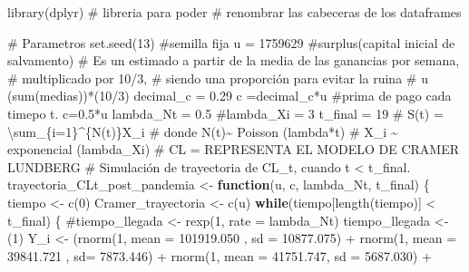 \documentclass[
  us-letterpaper,
]{scrreprt}
\newenvironment{Shaded}{\begin{snugshade}}{\end{snugshade}}
\newcommand{\AttributeTok}[1]{\textcolor[rgb]{0.40,0.45,0.13}{#1}}
\newcommand{\CommentTok}[1]{\textcolor[rgb]{0.37,0.37,0.37}{#1}}
\newcommand{\ControlFlowTok}[1]{\textcolor[rgb]{0.00,0.23,0.31}{\textbf{#1}}}
\newcommand{\DecValTok}[1]{\textcolor[rgb]{0.68,0.00,0.00}{#1}}
\newcommand{\FloatTok}[1]{\textcolor[rgb]{0.68,0.00,0.00}{#1}}
\newcommand{\FunctionTok}[1]{\textcolor[rgb]{0.28,0.35,0.67}{#1}}
\newcommand{\NormalTok}[1]{\textcolor[rgb]{0.00,0.23,0.31}{#1}}
\newcommand{\OtherTok}[1]{\textcolor[rgb]{0.00,0.23,0.31}{#1}}
\newcommand{\SpecialCharTok}[1]{\textcolor[rgb]{0.37,0.37,0.37}{#1}}
\theoremstyle{plain}
\theoremstyle{plain}
\theoremstyle{definition}
\theoremstyle{remark}
\begin{document}
\begin{Shaded}
\begin{Highlighting}[]
\FunctionTok{library}\NormalTok{(dplyr) }\CommentTok{\# libreria para poder }
\CommentTok{\# renombrar las cabeceras de los dataframes}

\CommentTok{\# Parametros}
\FunctionTok{set.seed}\NormalTok{(}\DecValTok{13}\NormalTok{) }\CommentTok{\#semilla fija}
\NormalTok{u }\OtherTok{=} \DecValTok{1759629} \CommentTok{\#surplus(capital inicial de salvamento)}
\CommentTok{\# Es un estimado a partir de la media de las ganancias por semana, }
\CommentTok{\# multiplicado por 10/3, }
\CommentTok{\# siendo una proporción para evitar la ruina}
\CommentTok{\# u (sum(medias))*(10/3)}
\NormalTok{decimal\_c }\OtherTok{=} \FloatTok{0.29}
\NormalTok{c }\OtherTok{=}\NormalTok{decimal\_c}\SpecialCharTok{*}\NormalTok{u }\CommentTok{\#prima de pago cada timepo t. c=0.5*u}
\NormalTok{lambda\_Nt }\OtherTok{=} \FloatTok{0.5}
\CommentTok{\#lambda\_Xi = 3}
\NormalTok{t\_final }\OtherTok{=} \DecValTok{19}
\CommentTok{\# S(t) = \textbackslash{}sum\_\{i=1\}\^{}\{N(t)\}X\_i}
\CommentTok{\# donde N(t)\textasciitilde{} Poisson (lambda*t)}
\CommentTok{\# X\_i \textasciitilde{} exponencial (lambda\_Xi)}
\CommentTok{\# CL = REPRESENTA EL MODELO DE CRAMER LUNDBERG}
\CommentTok{\# Simulación de trayectoria de CL\_t, cuando t \textless{} t\_final.}
\NormalTok{trayectoria\_CLt\_post\_pandemia }\OtherTok{\textless{}{-}} \ControlFlowTok{function}\NormalTok{(u, c, lambda\_Nt, t\_final)}
\NormalTok{\{}
\NormalTok{  tiempo }\OtherTok{\textless{}{-}} \FunctionTok{c}\NormalTok{(}\DecValTok{0}\NormalTok{)}
\NormalTok{  Cramer\_trayectoria }\OtherTok{\textless{}{-}} \FunctionTok{c}\NormalTok{(u)}
  \ControlFlowTok{while}\NormalTok{(tiempo[}\FunctionTok{length}\NormalTok{(tiempo)] }\SpecialCharTok{\textless{}}\NormalTok{ t\_final)}
\NormalTok{  \{}
    \CommentTok{\#tiempo\_llegada \textless{}{-} rexp(1, rate = lambda\_Nt)}
\NormalTok{    tiempo\_llegada }\OtherTok{\textless{}{-}}\NormalTok{ (}\DecValTok{1}\NormalTok{)}
\NormalTok{    Y\_i }\OtherTok{\textless{}{-}}\NormalTok{  (}\FunctionTok{rnorm}\NormalTok{(}\DecValTok{1}\NormalTok{, }\AttributeTok{mean =} \FloatTok{101919.050}\NormalTok{ , }\AttributeTok{sd =} \FloatTok{10877.075}\NormalTok{) }\SpecialCharTok{+} 
              \FunctionTok{rnorm}\NormalTok{(}\DecValTok{1}\NormalTok{, }\AttributeTok{mean =}  \FloatTok{39841.721}\NormalTok{ , }\AttributeTok{sd=} \FloatTok{7873.446}\NormalTok{)  }\SpecialCharTok{+}  
              \FunctionTok{rnorm}\NormalTok{(}\DecValTok{1}\NormalTok{, }\AttributeTok{mean =}   \FloatTok{41751.747}\NormalTok{, }\AttributeTok{sd =} \FloatTok{5687.030}\NormalTok{) }\SpecialCharTok{+} 

\end{Highlighting}
\end{Shaded}
\end{document}
